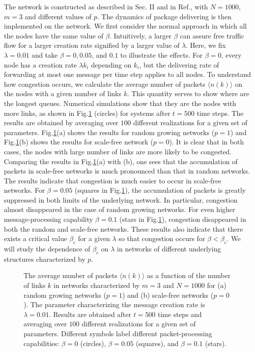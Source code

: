 \documentclass[aps,prl,twocolumn,superscriptaddress,showpacs]{revtex4}
\begin{document}
The network is constructed as described in Sec. II and in
Ref.\cite{LLYD:2002}, with $N=1000$, $m=3$ and different values of
$p$.  The dynamics of package delivering is then implemented on
the network. We first consider the normal approach in which all
the nodes have the same value of $\beta$. Intuitively, a larger
$\beta$ can assure free traffic flow for a larger creation rate
signified by a larger value of $\lambda$. Here, we fix
$\lambda=0.01$ and take $\beta=0, 0.05$, and $0.1$ to illustrate
the effects.  For $\beta=0$, every node has a creation rate
$\lambda k_i$ depending on $k_{i}$, but the delivering rate of
forwarding at most one message per time step applies to all nodes.
To understand how congestion occurs, we calculate the average
number of packets $\langle n(k) \rangle$ on the nodes with a given
number of links $k$.  This quantity serves to show where are the
longest queues. Numerical simulations show that they are the nodes
with more links, as shown in Fig.\ref{fig1} (circles) for systems
after $t=500$ time steps. The results are obtained by averaging
over $100$ different realizations for a given set of parameters.
Fig.\ref{fig1}(a) shows the results for random growing networks
($p=1$) and Fig.\ref{fig1}(b) shows the results for scale-free
network ($p=0$). It is clear that in both cases, the nodes with
large number of links are more likely to be congested. Comparing
the results in Fig.\ref{fig1}(a) with (b), one sees that the
accumulation of packets in scale-free networks is much pronounced
than that in random networks.  The results indicate that
congestion is much easier to occur in scale-free networks. For
$\beta=0.05$ (squares in Fig.\ref{fig1}), the accumulation of
packets is greatly suppressed in both limits of the underlying
network.  In particular, congestion almost disappeared in the case
of random growing networks. For even higher message-processing
capability $\beta=0.1$ (stars in Fig.\ref{fig1}), congestion
disappeared in both the random and scale-free networks.  These
results also indicate that there exists a critical value
$\beta_{c}$ for a given $\lambda$ so that congestion occurs for
$\beta < \beta_{c}$. We will study the dependence of $\beta_{c}$
on $\lambda$ in networks of different underlying structures
characterized by $p$.

\begin{figure}
\begin{center}
 \caption{The
average number of packets $\langle n(k) \rangle$ as a function of
the number of links $k$ in networks characterized by $m=3$ and
$N=1000$ for (a) random growing networks ($p=1$) and (b)
scale-free networks ($p=0$). The parameter characterizing the
message creation rate is $\lambda=0.01$.  Results are obtained
after $t=500$ time steps and averaging over $100$ different
realizations for a given set of parameters.  Different symbols
label different packet-processing capabilities: $\beta=0$
(circles), $\beta=0.05$ (squares), and $\beta = 0.1$ (stars).}
\label{fig1}
\end{center}
\end{figure}
\end{document}
